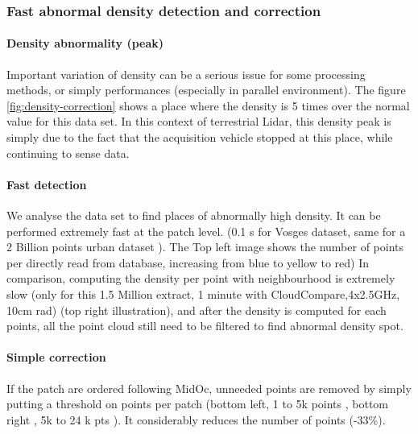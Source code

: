 		\subsubsection{Fast abnormal density detection and correction}
			
			
			\paragraph{Density abnormality (peak)}
				Important variation of density can be a serious issue for some processing methods, or simply performances (especially in parallel environment). 
				The figure \ref{fig:density-correction} shows a place where the density is 5 times over the normal value for this data set.
				In this context of terrestrial Lidar, this density peak is simply due to the fact that the acquisition vehicle stopped at this place, while continuing to sense data.
			\paragraph{Fast detection}
				We analyse the data set to find places of abnormally high density.
				It can be performed extremely fast at the patch level. (0.1 s for Vosges dataset, same for a 2 Billion points urban dataset ). 
				The Top left image shows the number of points per \cubic \meter directly read from database, increasing from blue to yellow to red)
				In comparison, computing the density per point with neighbourhood is extremely slow (only for this 1.5 Million extract, 1 minute with CloudCompare,4x2.5GHz, 10cm rad) (top right illustration), and after the density is computed for each points, all the point cloud still need to be filtered to find abnormal density spot.
			
			\paragraph{Simple correction}
				If the patch are ordered following MidOc, unneeded points are removed by simply putting a threshold on points per patch (bottom left, 1 to 5k points \per \cubic \meter , bottom right , 5k to 24 k pts \per \cubic \meter). It considerably reduces the number of points (-33\%).
			
